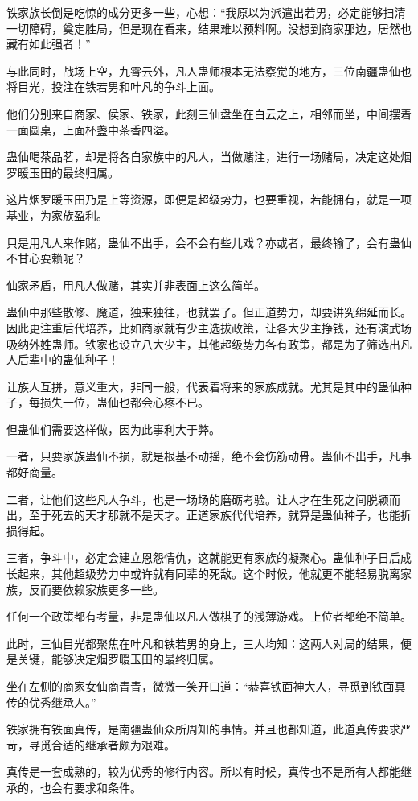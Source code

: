 \begin{this_body}
铁家族长倒是吃惊的成分更多一些，心想：“我原以为派遣出若男，必定能够扫清一切障碍，奠定胜局，但是现在看来，结果难以预料啊。没想到商家那边，居然也藏有如此强者！”

与此同时，战场上空，九霄云外，凡人蛊师根本无法察觉的地方，三位南疆蛊仙也将目光，投注在铁若男和叶凡的争斗上面。

他们分别来自商家、侯家、铁家，此刻三仙盘坐在白云之上，相邻而坐，中间摆着一面圆桌，上面杯盏中茶香四溢。

蛊仙喝茶品茗，却是将各自家族中的凡人，当做赌注，进行一场赌局，决定这处烟罗暖玉田的最终归属。

这片烟罗暖玉田乃是上等资源，即便是超级势力，也要重视，若能拥有，就是一项基业，为家族盈利。

只是用凡人来作赌，蛊仙不出手，会不会有些儿戏？亦或者，最终输了，会有蛊仙不甘心耍赖呢？

仙家矛盾，用凡人做赌，其实并非表面上这么简单。

蛊仙中那些散修、魔道，独来独往，也就罢了。但正道势力，却要讲究绵延而长。因此更注重后代培养，比如商家就有少主选拔政策，让各大少主挣钱，还有演武场吸纳外姓蛊师。铁家也设立八大少主，其他超级势力各有政策，都是为了筛选出凡人后辈中的蛊仙种子！

让族人互拼，意义重大，非同一般，代表着将来的家族成就。尤其是其中的蛊仙种子，每损失一位，蛊仙也都会心疼不已。

但蛊仙们需要这样做，因为此事利大于弊。

一者，只要家族蛊仙不损，就是根基不动摇，绝不会伤筋动骨。蛊仙不出手，凡事都好商量。

二者，让他们这些凡人争斗，也是一场场的磨砺考验。让人才在生死之间脱颖而出，至于死去的天才那就不是天才。正道家族代代培养，就算是蛊仙种子，也能折损得起。

三者，争斗中，必定会建立恩怨情仇，这就能更有家族的凝聚心。蛊仙种子日后成长起来，其他超级势力中或许就有同辈的死敌。这个时候，他就更不能轻易脱离家族，反而要依赖家族更多一些。

任何一个政策都有考量，非是蛊仙以凡人做棋子的浅薄游戏。上位者都绝不简单。

此时，三仙目光都聚焦在叶凡和铁若男的身上，三人均知：这两人对局的结果，便是关键，能够决定烟罗暖玉田的最终归属。

坐在左侧的商家女仙商青青，微微一笑开口道：“恭喜铁面神大人，寻觅到铁面真传的优秀继承人。”

铁家拥有铁面真传，是南疆蛊仙众所周知的事情。并且也都知道，此道真传要求严苛，寻觅合适的继承者颇为艰难。

真传是一套成熟的，较为优秀的修行内容。所以有时候，真传也不是所有人都能继承的，也会有要求和条件。


\end{this_body}
